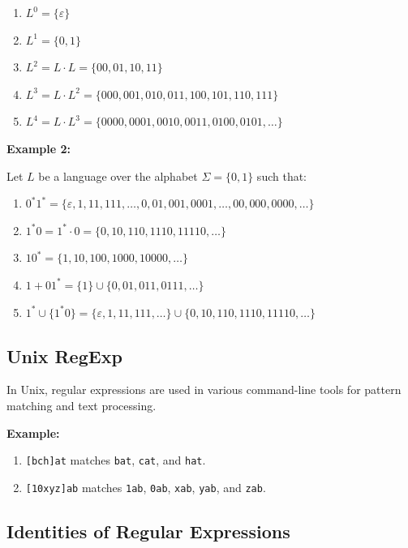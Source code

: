 \documentclass[12pt,a4paper,openany]{article}
\begin{document}
\begin{enumerate}
    \begin{enumerate}
    \item $L^0 = \{\varepsilon\}$
    \item $L^1 =  \{0,1\}$
    \item $L^2 = L\cdot L = \{00,01,10,11\}$
    \item $L^3 = L\cdot L^2 = \{000,001,010,011,100,101,110,111\}$
    \item $L^4 = L\cdot L^3 = \{0000,0001,0010,0011,0100,0101, \ldots\}$
    \end{enumerate}


    \textbf{Example 2:}

    Let $L$ be a language over the alphabet $\Sigma = \{0,1\}$ such that:

    \begin{enumerate}
        \item $0^*1^* = \{ \varepsilon, 1, 11, 111, \ldots, 0, 01, 001, 0001, \ldots, 00, 000, 0000, \ldots \}$
        \item $1^*0 = 1^*\cdot 0 = \{0, 10, 110, 1110, 11110, \ldots \}$
        \item $10^* = \{1, 10, 100, 1000, 10000, \ldots\}$
        \item $1+01^* = \{1\} \cup \{0, 01, 011, 0111, \ldots\}$
        \item $1^* \cup \{1^*0\} = \{\varepsilon, 1, 11, 111, \ldots\} \cup \{0, 10, 110, 1110, 11110, \ldots\}$
    \end{enumerate}


\end{enumerate}

\subsection{Unix RegExp}

In Unix, regular expressions are used in various command-line tools for pattern matching and text processing. 

\textbf{Example:}

\begin{enumerate}
\item \verb![bch]at! matches \texttt{bat}, \texttt{cat}, and \texttt{hat}.
\item \verb![10xyz]ab! matches \texttt{1ab}, \texttt{0ab}, \texttt{xab}, \texttt{yab}, and \texttt{zab}.
\end{enumerate}

\subsection{Identities of Regular Expressions}
\end{document}
